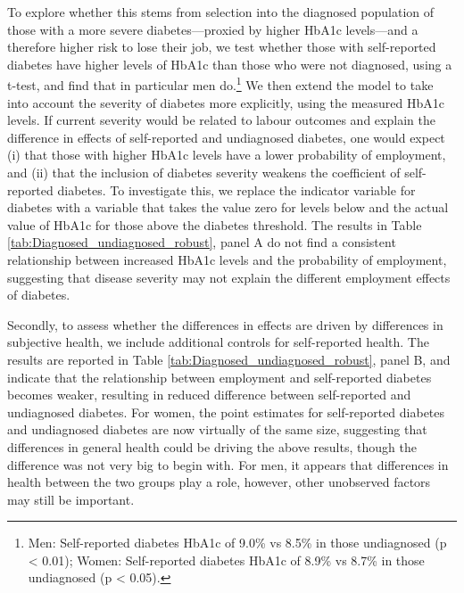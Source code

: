 \documentclass[12pt,english]{article}
\begin{document}
To explore whether this stems from selection into the diagnosed population of those with a more severe diabetes---proxied by higher \ac{HbA1c} levels---and a therefore higher risk to lose their job,  we test whether those with self-reported diabetes have higher levels of \ac{HbA1c} than those who were not diagnosed, using a t-test, and find that in particular men do.\footnote{Men: Self-reported diabetes \ac{HbA1c} of 9.0\% vs 8.5\% in those undiagnosed (p < 0.01); Women: Self-reported diabetes \ac{HbA1c} of 8.9\% vs 8.7\% in those undiagnosed (p < 0.05).} We then extend the model to take into account the severity of diabetes more explicitly, using the measured HbA1c levels. If current severity would be related to labour outcomes and explain the difference in effects of self-reported and undiagnosed diabetes, one would expect (i) that those with higher \ac{HbA1c} levels have a lower probability of employment, and (ii) that the inclusion of diabetes severity weakens the coefficient of self-reported diabetes.  To investigate this, we replace the indicator variable for diabetes with a variable that takes the value zero for levels below and the actual value of \ac{HbA1c} for those above the diabetes threshold. The results in Table \ref{tab:Diagnosed_undiagnosed_robust}, panel A do not find a consistent relationship between increased \ac{HbA1c} levels and the probability of employment, suggesting that disease severity may not explain the different employment effects of diabetes. 

Secondly, to assess whether the differences in effects are driven by differences in subjective health, we include additional controls for self-reported health. The results are reported in Table \ref{tab:Diagnosed_undiagnosed_robust}, panel B, and indicate that the relationship between employment and self-reported diabetes becomes weaker, resulting in reduced difference between self-reported and undiagnosed diabetes. For women, the point estimates for self-reported diabetes and undiagnosed diabetes are now virtually of the same size, suggesting that differences in general health could be driving the above results, though the difference was not very big to begin with. For men, it appears that differences in health between the two groups play a role, however, other unobserved factors may still be important.
\end{document}
